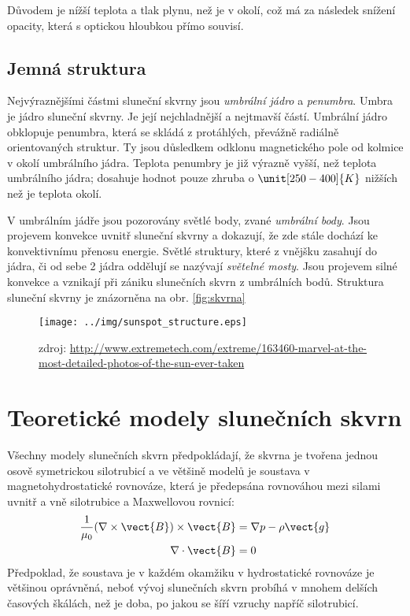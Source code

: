 Důvodem je nížší teplota a tlak plynu, než je v okolí, což má za následek snížení opacity, která s optickou hloubkou přímo souvisí.

\subsection{Jemná struktura}
Nejvýraznějšími částmi sluneční skvrny jsou \textit{umbrální jádro} a \textit{penumbra}. Umbra je jádro sluneční skvrny. Je její nejchladnější a nejtmavší částí. Umbrální jádro obklopuje penumbra, která se skládá z protáhlých, převážně radiálně orientovaných struktur. Ty jsou důsledkem odklonu magnetického pole od kolmice v okolí umbrálního jádra. Teplota penumbry je již výrazně vyšší, než teplota umbrálního jádra; dosahuje hodnot pouze zhruba o $\unit[250-400]{K}$ nižších než je teplota okolí.

V umbrálním jádře jsou pozorovány světlé body, zvané \textit{umbrální body}. Jsou projevem konvekce uvnitř sluneční skvrny a dokazují, že zde stále dochází ke konvektivnímu přenosu energie. Světlé struktury, které z vnějšku zasahují do jádra, či od sebe 2 jádra oddělují se nazývají \textit{světelné mosty}. Jsou projevem silné konvekce a vznikají při zániku slunečních skvrn z umbrálních bodů. Struktura sluneční skvrny je znázorněna na obr. \ref{fig:skvrna}

\begin{figure}[h!]
	\centering
	\texttt{[image: ../img/sunspot\_structure.eps]}
	\caption{zdroj: \url{http://www.extremetech.com/extreme/163460-marvel-at-the-most-detailed-photos-of-the-sun-ever-taken}}
	\label{fig:stavba}
\end{figure}


\section{Teoretické modely slunečních skvrn}
Všechny modely slunečních skvrn předpokládají, že skvrna je tvořena jednou osově symetrickou silotrubicí a ve většině modelů je soustava v magnetohydrostatické rovnováze, která je předepsána rovnováhou mezi silami uvnitř a vně silotrubice a Maxwellovou rovnicí:
\begin{align}
	\frac{1}{\mu_0}(\nabla\times\vect{B})\times\vect{B} &= \nabla p-\rho\vect{g} \label{eq:mh_equilib} \\
	\nabla\cdot\vect{B} &= 0
\end{align}
Předpoklad, že soustava je v každém okamžiku v hydrostatické rovnováze je většinou oprávněná, neboť vývoj slunečních skvrn probíhá v mnohem delších časových škálách, než je doba, po jakou se šíří vzruchy napříč silotrubicí.

